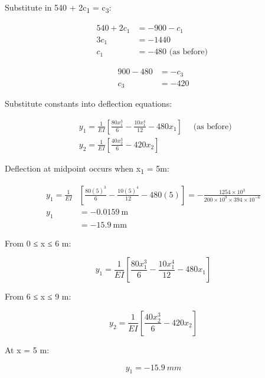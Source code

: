 \documentclass[
  letterpaper,
  DIV=11,
  numbers=noendperiod]{scrreprt}
\begin{document}
\begin{tcolorbox}
\begin{tcolorbox}
Substitute in 540 + 2c\textsubscript{1} = c\textsubscript{3}:

\[
\begin{aligned} 540+2 c_1 & =-900-c_1 \\ 3 c_1 & =-1440 \\ c_1 & =-480 \text { (as before) }\end{aligned}
\]

\[
\begin{aligned} 900-480 & =-c_3 \\ c_3 & =-420\end{aligned}
\]

Substitute constants into deflection equations:

\[
\begin{aligned} & y_1=\frac{1}{EI}\left[\frac{80 x_1^3}{6}-\frac{10 x_1^4}{12}-480 x_1\right] \quad \text { (as before) } \\ & y_2=\frac{1}{E I}\left[\frac{40 x_2^3}{6}-420 x_2\right]\end{aligned}
\]

Deflection at midpoint occurs when x\textsubscript{1} = 5m:

\[
\begin{aligned}y_1=\frac{1}{EI} & {\left[\frac{80(5)^3}{6}-\frac{10(5)^4}{12}-480(5)\right]=-\frac{1254 \times 10^3}{200 \times 10^9 \times 394 \times 10^{-6}} } \\y_1 & =-0.0159 \mathrm{~m} \\& =-15.9 \mathrm{~mm}\end{aligned}
\]

\end{tcolorbox}

\begin{tcolorbox}[enhanced jigsaw, colbacktitle=quarto-callout-note-color!10!white, title={Answer only}, coltitle=black, leftrule=.75mm, rightrule=.15mm, opacityback=0, breakable, colframe=quarto-callout-note-color-frame, left=2mm, arc=.35mm, colback=white, bottomrule=.15mm, bottomtitle=1mm, toptitle=1mm, titlerule=0mm, opacitybacktitle=0.6, toprule=.15mm]

From 0 ≤ x ≤ 6 m:

\[
y_1=\frac{1}{E I}\left[\frac{80 x_1^3}{6}-\frac{10 x_1^4}{12}-480 x_1\right]
\]

From 6 ≤ x ≤ 9 m:

\[
y_2=\frac{1}{E I}\left[\frac{40 x_2^3}{6}-420 x_2\right]
\]

At x = 5 m:

\[
y_1=-15.9~mm
\]

\end{tcolorbox}

\end{tcolorbox}
\end{document}

